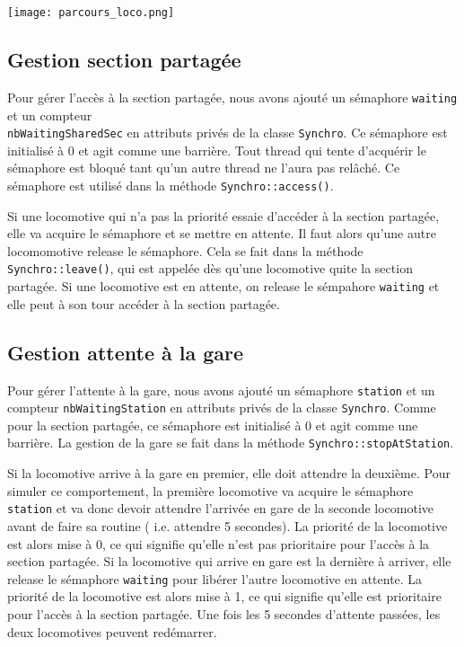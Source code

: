 \documentclass{article}
\begin{document}
\begin{center}
\texttt{[image: parcours\_loco.png]}
\end{center}

\subsection*{Gestion section partagée}
Pour gérer l'accès à la section partagée, nous avons ajouté un sémaphore \texttt{waiting} et un compteur 
\\ \texttt{nbWaitingSharedSec} en attributs privés de la classe \texttt{Synchro}.
Ce sémaphore est initialisé à 0 et agit comme une barrière. Tout thread qui tente d'acquérir le sémaphore est bloqué tant qu'un
autre thread ne l'aura pas relâché. Ce sémaphore est utilisé dans la méthode \texttt{Synchro::access()}. 

Si une locomotive qui n'a pas la priorité essaie d'accéder à la section partagée, elle va acquire le sémaphore et se mettre en attente. Il faut alors
qu'une autre locomomotive release le sémaphore. Cela se fait dans la méthode \texttt{Synchro::leave()}, qui est appelée dès qu'une
locomotive quite la section partagée. Si une locomotive est en attente, on release le sémpahore \texttt{waiting} et elle peut
à son tour accéder à la section partagée.

\subsection*{Gestion attente à la gare}
Pour gérer l'attente à la gare,  nous avons ajouté un sémaphore \texttt{station} et un compteur \texttt{nbWaitingStation} en attributs
privés de la classe \texttt{Synchro}. Comme pour la section partagée, ce sémaphore est initialisé à 0 et agit comme une barrière.
La gestion de la gare se fait dans la méthode \texttt{Synchro::stopAtStation}.

Si la locomotive arrive à la gare en premier, elle doit attendre la deuxième. Pour simuler ce comportement, la première locomotive
va acquire le sémaphore \texttt{station} et va donc devoir attendre l'arrivée en gare de la seconde locomotive avant de faire sa
routine ( i.e. attendre 5 secondes). La priorité de la locomotive est alors mise à 0, ce qui signifie qu'elle n'est pas prioritaire pour 
l'accès à la section partagée. Si la locomotive qui arrive en gare est la dernière à arriver, elle release le sémaphore \texttt{waiting} 
pour libérer l'autre locomotive en attente. La priorité de la locomotive est 
alors mise à 1, ce qui signifie qu'elle est prioritaire pour l'accès à la section partagée. 
Une fois les 5 secondes d'attente passées, les deux locomotives peuvent redémarrer.
\end{document}
